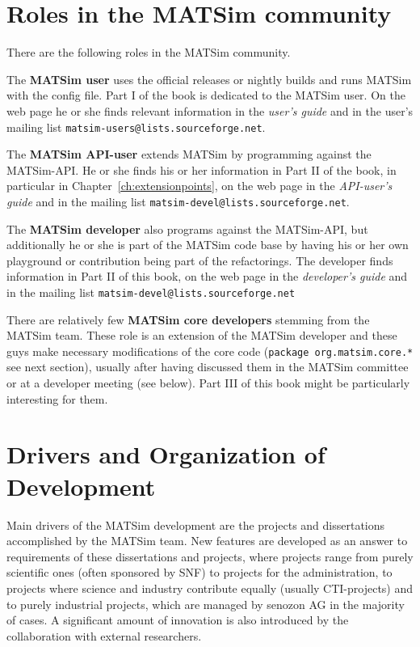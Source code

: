 \section{Roles in the MATSim community}
\label{sec:roles}
There are the following roles in the MATSim community.
%
\begin{compactitem}
\item The \textbf{MATSim user} uses the official releases or nightly builds and runs MATSim with the config file. Part I of the book is dedicated to the MATSim user. On the web page he or she finds relevant information in the \emph{user's guide} and in the user's mailing list \lstinline|matsim-users@lists.sourceforge.net|.
\item The \textbf{MATSim API-user} extends MATSim by programming against the MATSim-API. He or she finds his or her information in Part II of the book, in particular in Chapter~\ref{ch:extensionpoints}, on the web page in the \emph{API-user's guide} and in the mailing list \lstinline|matsim-devel@lists.sourceforge.net|.
\item The \textbf{MATSim developer} also programs against the MATSim-API, but additionally he or she is part of the MATSim code base by having his or her own playground or contribution being part of the refactorings. 
The developer finds information in Part II of this book, on the web page in the \emph{developer's guide} and in the mailing list \lstinline|matsim-devel@lists.sourceforge.net| 
\item There are relatively few \textbf{MATSim core developers} stemming from the MATSim team. These role is an extension of the MATSim developer and these guys make necessary modifications of the core code (\lstinline|package org.matsim.core.*| see next section), usually after having discussed them in the MATSim committee or at a developer meeting (see below). Part III of this book might be particularly interesting for them.
\end{compactitem}
%
\section{Drivers and Organization of Development}
Main drivers of the MATSim development are the projects and dissertations accomplished by the MATSim team. New features are developed as an answer to requirements of these dissertations and projects, where projects range from purely scientific ones (often sponsored by SNF) to projects for the administration, to projects where science and industry contribute equally (usually CTI-projects) and to purely industrial projects, which are managed by senozon AG in the majority of cases. A significant amount of innovation is also introduced by the collaboration with external researchers.

